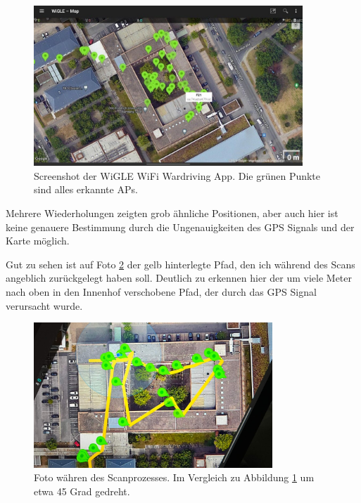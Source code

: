 \begin{figure}[h]
    \centering
    \includegraphics[width=0.9\textwidth]{figures/screen-wardriving.jpg}
    \caption{Screenshot der WiGLE WiFi Wardriving App. Die grünen Punkte sind alles erkannte APs.}
    \label{screen-wardriving}
\end{figure}

Mehrere Wiederholungen zeigten grob ähnliche Positionen, aber auch hier ist keine genauere Bestimmung durch die Ungenauigkeiten des GPS Signals und der Karte möglich.

Gut zu sehen ist auf Foto \ref{screen-wardriving-path} der gelb hinterlegte Pfad, den ich während des Scans angeblich zurückgelegt haben soll. Deutlich zu erkennen hier der um viele Meter nach oben in den Innenhof verschobene Pfad, der durch das GPS Signal verursacht wurde.

\begin{figure}[h]
    \centering
    \includegraphics[width=0.8\textwidth]{figures/screen-wardriving-path.jpg}
    \caption{Foto währen des Scanprozesses. Im Vergleich zu Abbildung \ref{screen-wardriving} um etwa 45 Grad gedreht.}
    \label{screen-wardriving-path}
\end{figure}


